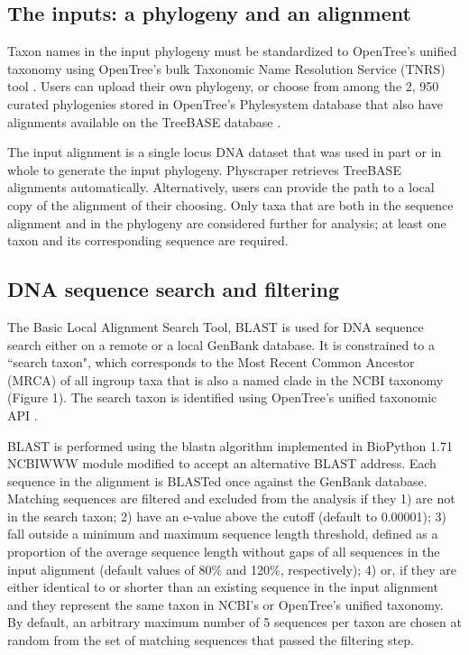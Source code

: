 \documentclass{bmcart}
\begin{document}
\subsection*{The inputs: a phylogeny and an alignment}

Taxon names in the input phylogeny must be standardized to OpenTree's unified taxonomy
\cite{ott3.2} using OpenTree's bulk Taxonomic Name Resolution Service
(TNRS) tool \cite{TNRStool}. Users can upload their
own phylogeny, or choose from among the 2, 950 curated phylogenies stored in OpenTree's
Phylesystem database \cite{phylesystemGithub} that also have
alignments available on the TreeBASE database \cite{treebase_website, supertreebase}.

The input alignment is a single locus DNA dataset that was used in part or in
whole to generate the input phylogeny. Physcraper retrieves TreeBASE alignments
automatically. Alternatively, users can provide the path to a local copy of the
alignment of their choosing.
Only taxa that are both in the sequence alignment and in the phylogeny are considered
further for analysis; at least one taxon and its corresponding sequence are required.

\subsection*{DNA sequence search and filtering}

The Basic Local Alignment Search Tool, BLAST \cite{altschul1990basic} is used for DNA
sequence search either on a remote or a local GenBank database. It is constrained to a
 ``search taxon", which corresponds to the Most Recent Common Ancestor (MRCA) of
all ingroup taxa that is also a named clade in the NCBI taxonomy (Figure 1). The
search taxon is identified using OpenTree's unified taxonomic API \cite{mrcaAPI}.

BLAST is performed using the blastn algorithm \cite{camacho2009blast}
implemented in BioPython 1.71 \cite{cock2009biopython} NCBIWWW module \cite{ncbiwww}
modified to accept an alternative BLAST address.
Each sequence in the alignment is BLASTed once against the GenBank database.
Matching sequences are filtered and excluded from the analysis if they 1) are not in the search taxon;
2) have an e-value above the cutoff (default to 0.00001); 3) fall outside a minimum
and maximum sequence length threshold, defined as a proportion of the average sequence length without
gaps of all sequences in the input alignment (default values of 80\% and 120\%,
respectively); 4) or, if they are either identical to or shorter than an existing
sequence in the input alignment and they represent the same taxon in NCBI's or
OpenTree's unified taxonomy.
By default, an arbitrary maximum number of 5 sequences per taxon are chosen at random
from the set of matching sequences that passed the filtering step.
\end{document}
